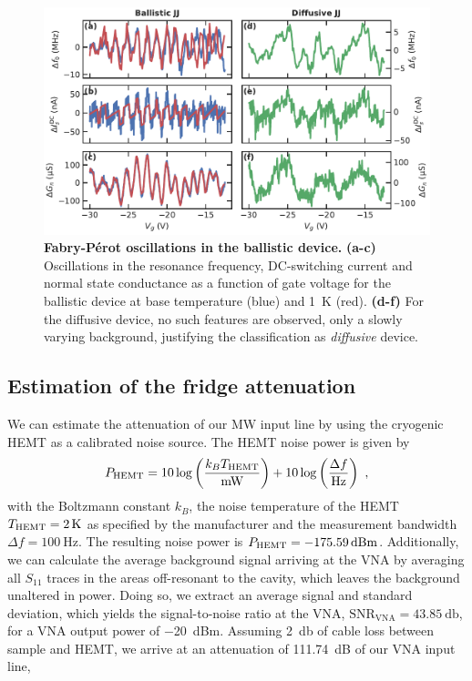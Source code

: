 \begin{figure}[!h]
	\centering
	\includegraphics[width=\linewidth]{chapter-gJJ-CPR/figs/SMFigure-ballistic}
	\caption{
		\textbf{Fabry-Pérot oscillations in the ballistic device.}
		\textbf{(a-c)} Oscillations in the resonance frequency, DC-switching current and normal state conductance as a function of gate voltage for the ballistic device at base temperature (blue) and \SI{1}{\kelvin} (red).
		\textbf{(d-f)} For the diffusive device, no such features are observed, only a slowly varying background, justifying the classification as \textit{diffusive} device.
	}
	\label{fig:SMFig-ballistic}
\end{figure}



\subsection{Estimation of the fridge attenuation}\label{sec:SMattenuation}

We can estimate the attenuation of our MW input line by using the cryogenic HEMT as a calibrated noise source.
%
The HEMT noise power is given by
%
\begin{align}
P_{\rm HEMT}=10\log\left(\frac{k_B T_{\rm HEMT}}{\si{\milli\watt}}\right) + 10\log\left(\frac{\Delta f}{\si{\hertz}}\right)\ ,
\label{eq:HEMT}
\end{align}
%
with the Boltzmann constant $k_B$, the noise temperature of the HEMT $T_{\rm HEMT}=\SI{2}{\kelvin}$ as specified by the manufacturer and the measurement bandwidth $\Delta f=\SI{100}{\hertz}$.
%
The resulting noise power is $P_{\rm HEMT}=\SI{-175.59}{dBm}$.
%
Additionally, we can calculate the average background signal arriving at the VNA by averaging all $S_{11}$ traces in the areas off-resonant to the cavity, which leaves the background unaltered in power.
%
Doing so, we extract an average signal and standard deviation, which yields the signal-to-noise ratio at the VNA, $\text{SNR}_\text{VNA}=\SI{43.85}{\decibel}$, for a VNA output power of \SI{-20}{dBm}.
%
Assuming \SI{2}{\decibel} of cable loss between sample and HEMT, we arrive at an attenuation of \SI{111.74}{dB} of our VNA input line,

